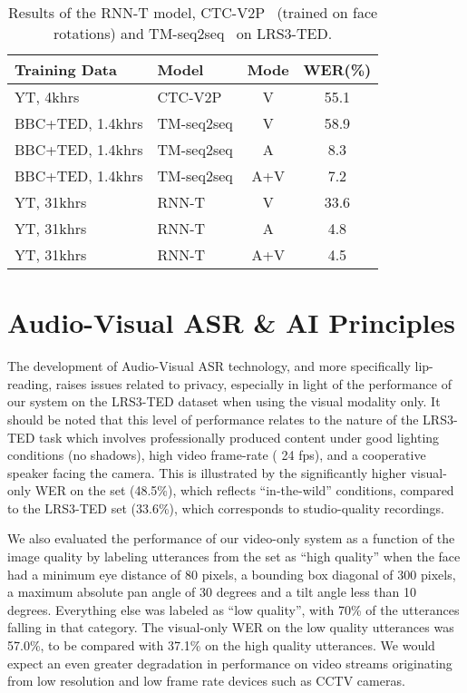 \documentclass{article}
\newcommand{\lrsted}{\textsc{LRS3-TED}\xspace}
\newcommand{\negsectionspace}{\vspace{-4pt}}
\newcommand{\negfigspace}{\vspace{-4pt}}
\begin{document}
\begin{table}[h]
  \centering
\begin{tabular}{llcc}
    \toprule
    Training Data    & Model           & Mode   & WER(\%) \\
    \midrule
    YT, 4khrs        & CTC-V2P           & V & 55.1 \\
    \midrule
    BBC+TED, 1.4khrs & TM-seq2seq    & V   & 58.9  \\
    BBC+TED, 1.4khrs & TM-seq2seq    & A   & \phantom{0}8.3  \\
    BBC+TED, 1.4khrs & TM-seq2seq    & A+V & \phantom{0}7.2  \\
    \midrule
    YT, 31khrs & RNN-T              & V    & 33.6 \\
    YT, 31khrs & RNN-T              & A    & \phantom{0}4.8 \\
    YT, 31khrs & RNN-T              & A+V  & \phantom{0}4.5 \\
    \bottomrule
  \end{tabular}
  \caption{Results of the RNN-T model,
    CTC-V2P~\citet{dm_lsvsr_2018} (trained on  face
    rotations) and TM-seq2seq~\citet{ox_davsr_2018} on \lrsted.}
  \label{tb:ted_results}
  \negfigspace
  \vspace{-6pt}
\end{table}

\negsectionspace
\section{Audio-Visual ASR \& AI Principles}
\label{principles}
\negsectionspace
The development of Audio-Visual ASR technology, and more specifically
lip-reading, raises issues related to privacy, especially in light of
the performance of our system on the \lrsted dataset when using the
visual modality only. It should be noted that this level of
performance relates to the nature of the \lrsted task which involves
professionally produced content under good lighting conditions (no
shadows), high video frame-rate ( 24 fps), and a cooperative
speaker facing the camera. This is illustrated by the significantly
higher visual-only WER on the \ytdev set (48.5\%), which reflects
``in-the-wild'' conditions, compared to the \lrsted set (33.6\%), which
corresponds to studio-quality recordings.

We also evaluated the performance of our video-only system as a
function of the image quality by labeling utterances from the \ytdev
set as ``high quality'' when the face had a minimum eye distance of 80
pixels, a bounding box diagonal of 300 pixels, a maximum absolute pan
angle of 30 degrees and a tilt angle less than 10 degrees. Everything
else was labeled as ``low quality'', with 70\% of the utterances
falling in that category. The visual-only WER on the low quality
utterances was 57.0\%, to be compared with 37.1\% on the high quality
utterances. We would expect an even greater degradation in performance
on video streams originating from low resolution and low frame rate
devices such as CCTV cameras.
\end{document}
